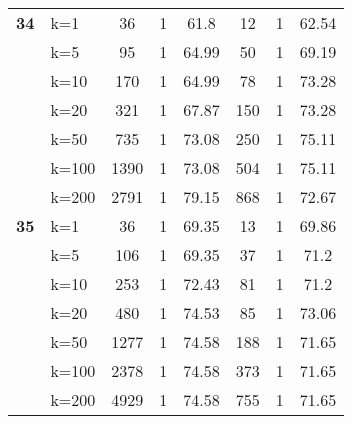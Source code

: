 \begin{table}[htbp]
\begin{tabular}{|l|l|c|c|c|c|c|c|}
    \multicolumn{1}{|r|}{\textbf{34}} & k=1 & 36 & 1 & 61.8 & 12 & 1 & 62.54 \\ 
     & k=5 & 95 & 1 & 64.99 & 50 & 1 & 69.19 \\ 
     & k=10 & 170 & 1 & 64.99 & 78 & 1 & 73.28 \\ 
     & k=20 & 321 & 1 & 67.87 & 150 & 1 & 73.28 \\ 
     & k=50 & 735 & 1 & 73.08 & 250 & 1 & 75.11 \\ 
     & k=100 & 1390 & 1 & 73.08 & 504 & 1 & 75.11 \\ 
     & k=200 & 2791 & 1 & 79.15 & 868 & 1 & 72.67 \\ \hline
    \multicolumn{1}{|r|}{\textbf{35}} & k=1 & 36 & 1 & 69.35 & 13 & 1 & 69.86 \\ 
     & k=5 & 106 & 1 & 69.35 & 37 & 1 & 71.2 \\ 
     & k=10 & 253 & 1 & 72.43 & 81 & 1 & 71.2 \\ 
     & k=20 & 480 & 1 & 74.53 & 85 & 1 & 73.06 \\ 
     & k=50 & 1277 & 1 & 74.58 & 188 & 1 & 71.65 \\ 
     & k=100 & 2378 & 1 & 74.58 & 373 & 1 & 71.65 \\ 
     & k=200 & 4929 & 1 & 74.58 & 755 & 1 & 71.65 \\ \hline
    \end{tabular}
\end{table}
